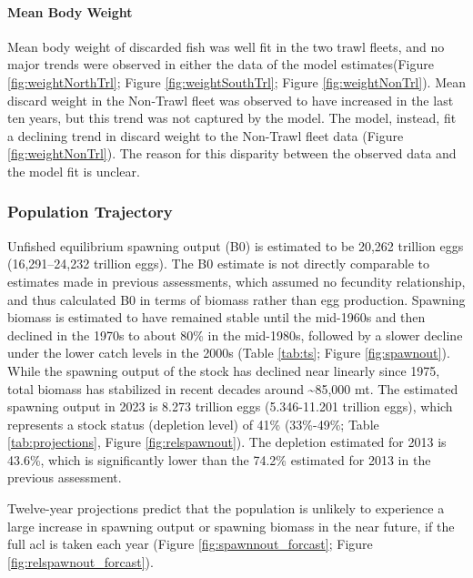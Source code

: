 \documentclass[11pt,
  english,
  letterpaper,
]{article}
\begin{document}
\hypertarget{mean-body-weight}{%
\paragraph{Mean Body Weight}\label{mean-body-weight}}

Mean body weight of discarded fish was well fit in the two trawl fleets, and no major trends were observed in either the data of the model estimates(Figure \ref{fig:weightNorthTrl}; Figure \ref{fig:weightSouthTrl}; Figure \ref{fig:weightNonTrl}). Mean discard weight in the Non-Trawl fleet was observed to have increased in the last ten years, but this trend was not captured by the model. The model, instead, fit a declining trend in discard weight to the Non-Trawl fleet data (Figure \ref{fig:weightNonTrl}). The reason for this disparity between the observed data and the model fit is unclear.

\hypertarget{population-trajectory}{%
\subsubsection{Population Trajectory}\label{population-trajectory}}

Unfished equilibrium spawning output (B0) is estimated to be 20,262 trillion eggs (16,291--24,232 trillion eggs). The B0 estimate is not directly comparable to estimates made in previous assessments, which assumed no fecundity relationship, and thus calculated B0 in terms of biomass rather than egg production. Spawning biomass is estimated to have remained stable until the mid-1960s and then declined in the 1970s to about 80\% in the mid-1980s, followed by a slower decline under the lower catch levels in the 2000s (Table \ref{tab:ts}; Figure \ref{fig:spawnout}). While the spawning output of the stock has declined near linearly since 1975, total biomass has stabilized in recent decades around \textasciitilde85,000 mt. The estimated spawning output in 2023 is 8.273 trillion eggs (5.346-11.201 trillion eggs), which represents a stock status (depletion level) of 41\% (33\%-49\%; Table \ref{tab:projections}, Figure \ref{fig:relspawnout}). The depletion estimated for 2013 is 43.6\%, which is significantly lower than the 74.2\% estimated for 2013 in the previous assessment.

Twelve-year projections predict that the population is unlikely to experience a large increase in spawning output or spawning biomass in the near future, if the full \gls{acl} is taken each year (Figure \ref{fig:spawnnout_forcast}; Figure \ref{fig:relspawnout_forcast}).
\end{document}
